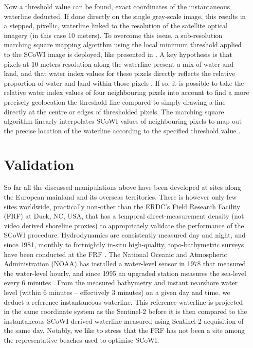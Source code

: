 \documentclass[remotesensing,article,submit,pdftex,moreauthors]{Definitions/mdpi}
\begin{document}
Now a threshold value can be found, exact coordinates of the instantaneous waterline deducted. If done directly on the single grey-scale image, this results in a stepped, pixellic, waterline linked to the resolution of the satellite optical imagery (in this case 10 meters). To overcome this issue, a sub-resolution marching square mapping algorithm using the local minimum threshold applied to the SCoWI image is deployed, like presented in \citet{VOS2019_sub}. A key hypothesis is that pixels at 10 meters resolution along the waterline present a mix of water and land, and that water index values for these pixels directly reflects the relative proportion of water and land within those pixels \citep{Bishop_sub_pixel}. If so, it is possible to take the relative water index values of four neighbouring pixels into account to find a more precisely geolocation the threshold line compared to simply drawing a line directly at the centre or edges of thresholded pixels. The marching square algorithm linearly interpolates SCoWI values of neighbouring pixels to map out the precise location of the waterline according to the specified threshold value \citep{CIPOLLETTI201287}.

\section{Validation}
So far all the discussed manipulations above have been developed at sites along the European mainland and its overseas territories. There is however only few sites worldwide, practically non-other than the ERDC's Field Research Facility (FRF) at Duck, NC, USA, that has a temporal direct-measurement density (not video derived shoreline proxies) to appropriately validate the performance of the SCoWI procedure. Hydrodynamics are consistently measured day and night, and since 1981, monthly to fortnightly in-situ high-quality, topo-bathymetric surveys have been conducted at the FRF \citep{FORTE2017}. The National Oceanic and Atmospheric Administration (NOAA) has installed a water-level sensor in 1978 that measured the water-level hourly, and since 1995 an upgraded station measures the sea-level every 6 minutes \citep{park2014water}. From the measured bathymetry and instant nearshore water level (within 6 minutes -- effectively 3 minutes) on a given day and time, we deduct a reference instantaneous waterline. This reference waterline is projected in the same coordinate system as the Sentinel-2 before it is then compared to the instantaneous SCoWI derived waterline measured using Sentinel-2 acquisition of the same day. Notably, we like to stress that the FRF has not been a site among the representative beaches used to optimise SCoWI.
\end{document}
